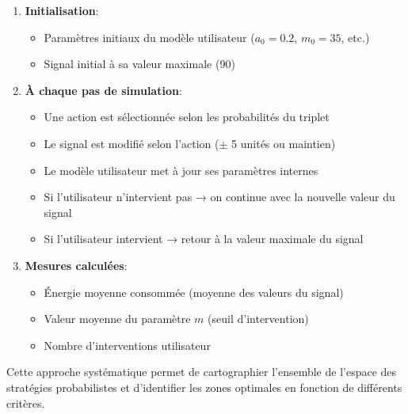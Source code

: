 \begin{enumerate}
    \item \textbf{Initialisation}:
    \begin{itemize}
        \item Paramètres initiaux du modèle utilisateur ($a_0=0.2$, $m_0=35$, etc.)
        \item Signal initial à sa valeur maximale (90)
    \end{itemize}
    
    \item \textbf{À chaque pas de simulation}:
    \begin{itemize}
        \item Une action est sélectionnée selon les probabilités du triplet
        \item Le signal est modifié selon l'action ($\pm$ 5 unités ou maintien)
        \item Le modèle utilisateur met à jour ses paramètres internes
        \item Si l'utilisateur n'intervient pas → on continue avec la nouvelle valeur du signal
        \item Si l'utilisateur intervient → retour à la valeur maximale du signal
    \end{itemize}
    
    \item \textbf{Mesures calculées}:
    \begin{itemize}
        \item Énergie moyenne consommée (moyenne des valeurs du signal)
        \item Valeur moyenne du paramètre $m$ (seuil d'intervention)
        \item Nombre d'interventions utilisateur
    \end{itemize}
\end{enumerate}

Cette approche systématique permet de cartographier l'ensemble de l'espace des stratégies probabilistes et d'identifier les zones optimales en fonction de différents critères.


